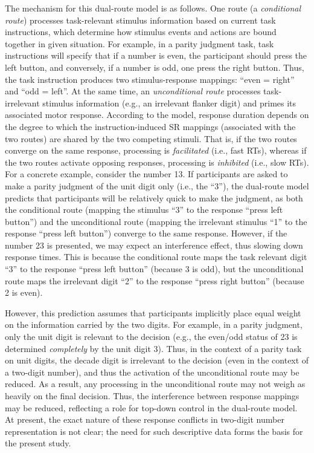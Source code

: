\documentclass[english,man]{apa6}
\theoremstyle{definition}
\theoremstyle{definition}
\theoremstyle{definition}
\theoremstyle{remark}
\begin{document}
The mechanism for this dual-route model is as follows. One route (a
\emph{conditional route}) processes task-relevant stimulus information
based on current task instructions, which determine how stimulus events
and actions are bound together in given situation. For example, in a
parity judgment task, task instructions will specify that if a number is
even, the participant should press the left button, and conversely, if a
number is odd, one press the right button. Thus, the task instruction
produces two stimulus-response mappings: \enquote{even = right} and
\enquote{odd = left}. At the same time, an \emph{unconditional route}
processes task-irrelevant stimulus information (e.g., an irrelevant
flanker digit) and primes its associated motor response. According to
the model, response duration depends on the degree to which the
instruction-induced SR mappings (associated with the two routes) are
shared by the two competing stimuli. That is, if the two routes converge
on the same response, processing is \emph{facilitated} (i.e., fast RTs),
whereas if the two routes activate opposing responses, processing is
\emph{inhibited} (i.e., slow RTs). For a concrete example, consider the
number 13. If participants are asked to make a parity judgment of the
unit digit only (i.e., the \enquote{3}), the dual-route model predicts
that participants will be relatively quick to make the judgment, as both
the conditional route (mapping the stimulus \enquote{3} to the response
\enquote{press left button}) and the unconditional route (mapping the
irrelevant stimulus \enquote{1} to the response \enquote{press left
button}) converge to the same response. However, if the number 23 is
presented, we may expect an interference effect, thus slowing down
response times. This is because the conditional route maps the task
relevant digit \enquote{3} to the response \enquote{press left button}
(because 3 is odd), but the unconditional route maps the irrelevant
digit \enquote{2} to the response \enquote{press right button} (because
2 is even).

However, this prediction assumes that participants implicitly place
equal weight on the information carried by the two digits. For example,
in a parity judgment, only the unit digit is relevant to the decision
(e.g., the even/odd status of 23 is determined \emph{completely} by the
unit digit 3). Thus, in the context of a parity task on unit digits, the
decade digit is irrelevant to the decision (even in the context of a
two-digit number), and thus the activation of the unconditional route
may be reduced. As a result, any processing in the unconditional route
may not weigh as heavily on the final decision. Thus, the interference
between response mappings may be reduced, reflecting a role for top-down
control in the dual-route model. At present, the exact nature of these
response conflicts in two-digit number representation is not clear; the
need for such descriptive data forms the basis for the present study.
\end{document}
